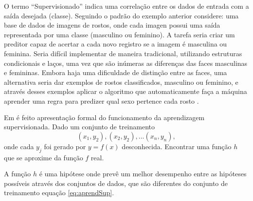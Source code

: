 O termo ``Supervisionado'' indica uma correlação entre os dados de entrada com a saída desejada (classe). Seguindo o padrão do exemplo anterior considere: uma base de dados de imagens de rostos, onde cada imagen possui uma saída representada por uma classe (masculino ou feminino). A tarefa seria criar um preditor capaz de acertar a cada novo registro se a imagem é masculina ou feminina. Seria  difícil  implementar de maneira tradicional, utilizando estruturas condicionais e laços, uma vez que são inúmeras as diferenças das faces masculinas e femininas. Embora haja uma dificuldade de distinção entre as faces, uma alternativa seria dar exemplos de rostos classificados, masculino ou feminino,  e através desses exemplos aplicar o algoritmo que automaticamente faça a máquina aprender uma regra para predizer qual sexo pertence cada rosto  \cite{Barber2011}.

Em  é feito apresentação formal do funcionamento da aprendizagem supervisionada. Dado um conjunto de treinamento 
\begin{equation}
 (x_{1},y_{2}),(x_{2},y_{2}),...(x_{n},y_{n}),
 \label{eq:aprendSup}
\end{equation}
onde cada ${y_{j}} $ foi gerado por ${y=f(x)}$ desconhecida. Encontrar uma função ${h}$ que se aproxime da função ${f}$ real.


A função ${h}$ é uma hipótese onde prevê um melhor desempenho entre as hipóteses possíveis através dos conjuntos de dados, que são diferentes do conjunto de treinamento equação \ref{eq:aprendSup}.

